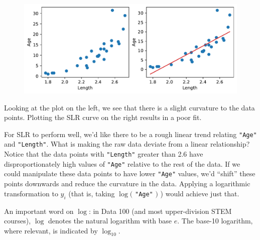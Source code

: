 \documentclass[
  letterpaper,
  DIV=11,
  numbers=noendperiod]{scrreprt}
\begin{document}
\begin{figure}[H]

{\centering \includegraphics{constant_model_loss_transformations/loss_transformations_files/figure-pdf/cell-6-output-1.pdf}

}

\end{figure}

Looking at the plot on the left, we see that there is a slight curvature
to the data points. Plotting the SLR curve on the right results in a
poor fit.

For SLR to perform well, we'd like there to be a rough linear trend
relating \texttt{"Age"} and \texttt{"Length"}. What is making the raw
data deviate from a linear relationship? Notice that the data points
with \texttt{"Length"} greater than 2.6 have disproportionately high
values of \texttt{"Age"} relative to the rest of the data. If we could
manipulate these data points to have lower \texttt{"Age"} values, we'd
``shift'' these points downwards and reduce the curvature in the data.
Applying a logarithmic transformation to \(y_i\) (that is, taking
\(\log(\) \texttt{"Age"} \()\) ) would achieve just that.

An important word on \(\log\): in Data 100 (and most upper-division STEM
courses), \(\log\) denotes the natural logarithm with base \(e\). The
base-10 logarithm, where relevant, is indicated by \(\log_{10}\).
\end{document}
